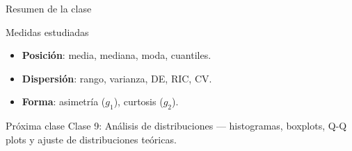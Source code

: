 \documentclass[aspectratio=169]{beamer}
\begin{document}
\begin{frame}{Resumen de la clase}
  \begin{block}{Medidas estudiadas}
    \begin{itemize}
      \item \textbf{Posición}: media, mediana, moda, cuantiles.
      \item \textbf{Dispersión}: rango, varianza, DE, RIC, CV.
      \item \textbf{Forma}: asimetría ($g_1$), curtosis ($g_2$).
    \end{itemize}
  \end{block}
  \bigskip
  \begin{block}{Próxima clase}
    Clase 9: Análisis de distribuciones — histogramas, boxplots, Q-Q plots y ajuste de distribuciones teóricas.
  \end{block}
\end{frame}
\end{document}
